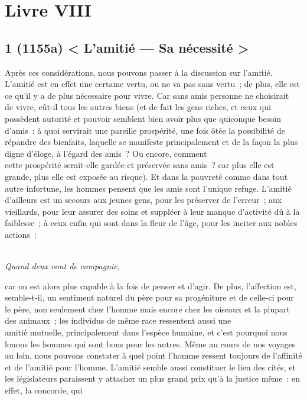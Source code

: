 \documentclass[french,twoside]{book} %
\begin{document}
\section[{Livre VIII}]{Livre VIII}\renewcommand{\leftmark}{Livre VIII}

\subsection[{1 (1155a) < L’amitié — Sa nécessité >}]{1 (1155a) < L’amitié — Sa nécessité >}
\noindent  Après ces considérations, nous pouvons passer à la discussion sur l’amitié. L’amitié est en effet une certaine vertu, ou ne va pas sans vertu ; de plus, elle est ce qu’il y a de plus nécessaire pour vivre. Car sans amis personne ne choisirait \\
de vivre, eût-il tous les autres biens (et de fait les gens riches, et ceux qui possèdent autorité et pouvoir semblent bien avoir plus que quiconque besoin d’amis : à quoi servirait une pareille prospérité, une fois ôtée la possibilité de répandre des bienfaits, laquelle se manifeste principalement et de la façon la plus digne d’éloge, à l’égard des amis ? Ou encore, comment \\
cette prospérité serait-elle gardée et préservée sans amis ? car plus elle est grande, plus elle est exposée au risque). Et dans la pauvreté comme dans tout autre infortune, les hommes pensent que les amis sont l’unique refuge. L’amitié d’ailleurs est un secours aux jeunes gens, pour les préserver de l’erreur ; aux vieillards, pour leur assurer des soins et suppléer à leur manque d’activité dû à la faiblesse ; à ceux enfin qui sont dans la fleur de l’âge, pour les inciter aux nobles actions :\par
\\
{\itshape Quand deux vont de compagnie}, \par
car on est alors plus capable à la fois de penser et d’agir. De plus, l’affection est, semble-t-il, un sentiment naturel du père pour sa progéniture et de celle-ci pour le père, non seulement chez l’homme mais encore chez les oiseaux et la plupart des animaux ; les individus de même race ressentent aussi une \\
amitié mutuelle, principalement dans l’espèce humaine, et c’est pourquoi nous louons les hommes qui sont bons pour les autres. Même au cours de nos voyages au loin, nous pouvons constater à quel point l’homme ressent toujours de l’affinité et de l’amitié pour l’homme. L’amitié semble aussi constituer le lien des cités, et les législateurs paraissent y attacher un plus grand prix qu’à la justice même : en effet, la concorde, qui \\
\end{document}
